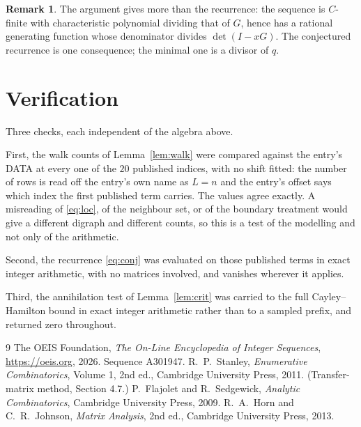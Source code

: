 \documentclass[11pt,a4paper]{article}
\theoremstyle{plain}
\theoremstyle{definition}
\newtheorem{remark}[theorem]{Remark}
\begin{document}
\begin{remark}
The argument gives more than the recurrence: the sequence is $C$-finite with characteristic
polynomial dividing that of $G$, hence has a rational generating function whose denominator
divides $\det(I-xG)$. The conjectured recurrence is one consequence; the minimal one is a
divisor of $q$.
\end{remark}

\section{Verification}

Three checks, each independent of the algebra above.

First, the walk counts of Lemma~\ref{lem:walk} were compared against the entry's DATA at
every one of the $20$ published indices, with no shift fitted: the number of rows is
read off the entry's own name as $L=n$ and the entry's offset says which index the first
published term carries. The values agree exactly. A misreading of \eqref{eq:loc}, of the
neighbour set, or of the boundary treatment would give a different digraph and different
counts, so this is a test of the modelling and not only of the arithmetic.

Second, the recurrence \eqref{eq:conj} was evaluated on those published terms in exact
integer arithmetic, with no matrices involved, and vanishes wherever it applies.

Third, the annihilation test of Lemma~\ref{lem:crit} was carried to the full
Cayley--Hamilton bound in exact integer arithmetic rather than to a sampled prefix, and
returned zero throughout.

\begin{thebibliography}{9}
 The OEIS Foundation, \emph{The On-Line Encyclopedia of Integer
Sequences}, \url{https://oeis.org}, 2026. Sequence A301947.
 R.~P.~Stanley, \emph{Enumerative Combinatorics}, Volume 1, 2nd ed.,
Cambridge University Press, 2011. (Transfer-matrix method, Section 4.7.)
 P.~Flajolet and R.~Sedgewick, \emph{Analytic Combinatorics}, Cambridge
University Press, 2009.
 R.~A.~Horn and C.~R.~Johnson, \emph{Matrix Analysis}, 2nd ed., Cambridge
University Press, 2013.
\end{thebibliography}
\end{document}
